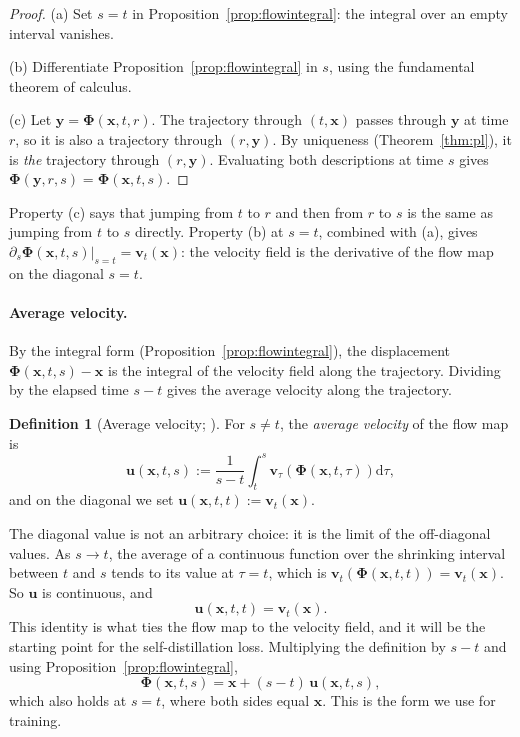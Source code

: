 \documentclass[11pt,a4paper]{article}
\numberwithin{equation}{section}     %
\theoremstyle{plain}        %
\theoremstyle{definition}   %
\newtheorem{definition}[theorem]{Definition}
\theoremstyle{remark}       %
\begin{document}
\begin{proof}
(a) Set $s=t$ in Proposition~\ref{prop:flowintegral}: the integral over an empty interval vanishes.

(b) Differentiate Proposition~\ref{prop:flowintegral} in $s$, using the fundamental theorem of calculus.

(c) Let $\mathbf{y}=\boldsymbol{\Phi}(\mathbf{x},t,r)$. The trajectory through $(t,\mathbf{x})$ passes through $\mathbf{y}$ at time $r$, so it is also a trajectory through $(r,\mathbf{y})$. By uniqueness (Theorem~\ref{thm:pl}), it is \emph{the} trajectory through $(r,\mathbf{y})$. Evaluating both descriptions at time $s$ gives $\boldsymbol{\Phi}(\mathbf{y},r,s)=\boldsymbol{\Phi}(\mathbf{x},t,s)$.
\end{proof}

Property (c) says that jumping from $t$ to $r$ and then from $r$ to $s$ is the same as jumping from $t$ to $s$ directly. Property (b) at $s=t$, combined with (a), gives $\partial_s\boldsymbol{\Phi}(\mathbf{x},t,s)\big|_{s=t}=\mathbf{v}_t(\mathbf{x})$: the velocity field is the derivative of the flow map on the diagonal $s=t$.

\paragraph{Average velocity.} By the integral form (Proposition~\ref{prop:flowintegral}), the displacement $\boldsymbol{\Phi}(\mathbf{x},t,s)-\mathbf{x}$ is the integral of the velocity field along the trajectory. Dividing by the elapsed time $s-t$ gives the average velocity along the trajectory.

\begin{definition}[Average velocity; \citealp{boffi2024flowmap,geng2025meanflow}]\label{def:avgvel}
For $s\neq t$, the \emph{average velocity} of the flow map is
\[
\mathbf{u}(\mathbf{x},t,s):=\frac{1}{s-t}\int_t^s\mathbf{v}_\tau\left(\boldsymbol{\Phi}(\mathbf{x},t,\tau)\right)\mathrm{d}\tau ,
\]
and on the diagonal we set $\mathbf{u}(\mathbf{x},t,t):=\mathbf{v}_t(\mathbf{x})$.
\end{definition}

The diagonal value is not an arbitrary choice: it is the limit of the off-diagonal values. As $s\to t$, the average of a continuous function over the shrinking interval between $t$ and $s$ tends to its value at $\tau=t$, which is $\mathbf{v}_t(\boldsymbol{\Phi}(\mathbf{x},t,t))=\mathbf{v}_t(\mathbf{x})$. So $\mathbf{u}$ is continuous, and
\[
\mathbf{u}(\mathbf{x},t,t)=\mathbf{v}_t(\mathbf{x}).
\]
This identity is what ties the flow map to the velocity field, and it will be the starting point for the self-distillation loss. Multiplying the definition by $s-t$ and using Proposition~\ref{prop:flowintegral},
\begin{equation}\label{eq:flowavg}
\boldsymbol{\Phi}(\mathbf{x},t,s)=\mathbf{x}+(s-t)\,\mathbf{u}(\mathbf{x},t,s),
\end{equation}
which also holds at $s=t$, where both sides equal $\mathbf{x}$. This is the form we use for training.
\end{document}
